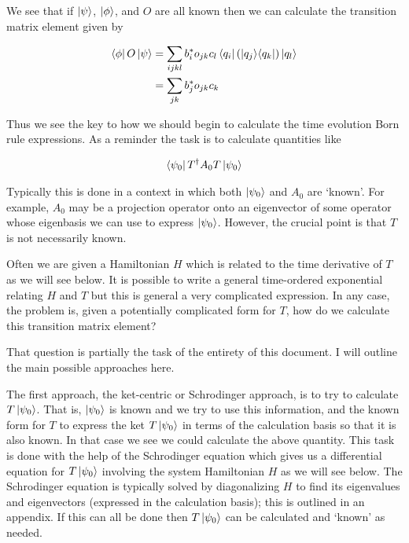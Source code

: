 \documentclass[12pt]{article}
\newcommand{\ketbra}[2]{\Ket{#1}\!\Bra{#2}}
\begin{document}
We see that if $\ket{\psi}$, $\ket{\phi}$, and $O$ are all known then we can calculate the transition matrix element given by

\begin{align}
\bra{\phi}O\ket{\psi} &= \sum_{ijkl} b_i^* o_{jk} c_l \bra{q_i} \left(\ketbra{q_j}{q_k}\right) \ket{q_l}\\
&= \sum_{jk} b_j^* o_{jk} c_k
\end{align}

Thus we see the key to how we should begin to calculate the time evolution Born rule expressions. As a reminder the task is to calculate quantities like

\begin{align}
\bra{\psi_0} T^{\dag} A_0 T \ket{\psi_0}
\end{align}

Typically this is done in a context in which both $\ket{\psi_0}$ and $A_0$ are `known'. For example, $A_0$ may be a projection operator onto an eigenvector of some operator whose eigenbasis we can use to express $\ket{\psi_0}$. However, the crucial point is that $T$ is not necessarily known.

Often we are given a Hamiltonian $H$ which is related to the time derivative of $T$ as we will see below. It is possible to write a general time-ordered exponential relating $H$ and $T$ but this is general a very complicated expression. In any case, the problem is, given a potentially complicated form for $T$, how do we calculate this transition matrix element?

That question is partially the task of the entirety of this document. I will outline the main possible approaches here.

The first approach, the ket-centric or Schrodinger approach, is to try to calculate $T\ket{\psi_0}$. That is, $\ket{\psi_0}$ is known and we try to use this information, and the known form for $T$ to express the ket $T \ket{\psi_0}$ in terms of the calculation basis so that it is also known. In that case we see we could calculate the above quantity. This task is done with the help of the Schrodinger equation which gives us a differential equation for $T\ket{\psi_0}$ involving the system Hamiltonian $H$ as we will see below. The Schrodinger equation is typically solved by diagonalizing $H$ to find its eigenvalues and eigenvectors (expressed in the calculation basis); this is outlined in an appendix. If this can all be done then $T\ket{\psi_0}$ can be calculated and `known' as needed.
\end{document}
